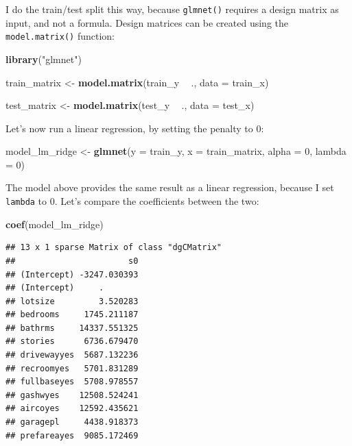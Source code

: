 \documentclass[]{gitbook}
\newenvironment{Shaded}{\begin{snugshade}}{\end{snugshade}}
\newcommand{\DataTypeTok}[1]{\textcolor[rgb]{0.13,0.29,0.53}{#1}}
\newcommand{\DecValTok}[1]{\textcolor[rgb]{0.00,0.00,0.81}{#1}}
\newcommand{\KeywordTok}[1]{\textcolor[rgb]{0.13,0.29,0.53}{\textbf{#1}}}
\newcommand{\NormalTok}[1]{#1}
\newcommand{\OperatorTok}[1]{\textcolor[rgb]{0.81,0.36,0.00}{\textbf{#1}}}
\newcommand{\StringTok}[1]{\textcolor[rgb]{0.31,0.60,0.02}{#1}}
\begin{document}
I do the train/test split this way, because \texttt{glmnet()} requires a design matrix as input, and not
a formula. Design matrices can be created using the \texttt{model.matrix()} function:

\begin{Shaded}
\begin{Highlighting}[]
\KeywordTok{library}\NormalTok{(}\StringTok{"glmnet"}\NormalTok{)}

\NormalTok{train_matrix <-}\StringTok{ }\KeywordTok{model.matrix}\NormalTok{(train_y }\OperatorTok{~}\StringTok{ }\NormalTok{., }\DataTypeTok{data =}\NormalTok{ train_x)}

\NormalTok{test_matrix <-}\StringTok{ }\KeywordTok{model.matrix}\NormalTok{(test_y }\OperatorTok{~}\StringTok{ }\NormalTok{., }\DataTypeTok{data =}\NormalTok{ test_x)}
\end{Highlighting}
\end{Shaded}

Let's now run a linear regression, by setting the penalty to 0:

\begin{Shaded}
\begin{Highlighting}[]
\NormalTok{model_lm_ridge <-}\StringTok{ }\KeywordTok{glmnet}\NormalTok{(}\DataTypeTok{y =}\NormalTok{ train_y, }\DataTypeTok{x =}\NormalTok{ train_matrix, }\DataTypeTok{alpha =} \DecValTok{0}\NormalTok{, }\DataTypeTok{lambda =} \DecValTok{0}\NormalTok{)}
\end{Highlighting}
\end{Shaded}

The model above provides the same result as a linear regression, because I set \texttt{lambda} to 0. Let's
compare the coefficients between the two:

\begin{Shaded}
\begin{Highlighting}[]
\KeywordTok{coef}\NormalTok{(model_lm_ridge)}
\end{Highlighting}
\end{Shaded}

\begin{verbatim}
## 13 x 1 sparse Matrix of class "dgCMatrix"
##                       s0
## (Intercept) -3247.030393
## (Intercept)     .       
## lotsize         3.520283
## bedrooms     1745.211187
## bathrms     14337.551325
## stories      6736.679470
## drivewayyes  5687.132236
## recroomyes   5701.831289
## fullbaseyes  5708.978557
## gashwyes    12508.524241
## aircoyes    12592.435621
## garagepl     4438.918373
## prefareayes  9085.172469
\end{verbatim}
\end{document}
